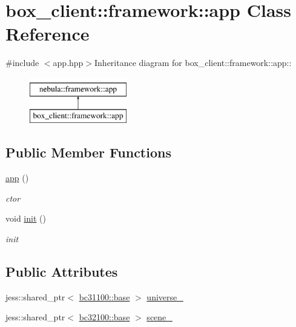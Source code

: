 \hypertarget{classbox__client_1_1framework_1_1app}{
\section{box\_\-client::framework::app Class Reference}
\label{classbox__client_1_1framework_1_1app}
}


{\ttfamily \#include $<$app.hpp$>$}Inheritance diagram for box\_\-client::framework::app::\begin{figure}[H]
\begin{center}
\leavevmode
\includegraphics[height=2cm]{classbox__client_1_1framework_1_1app}
\end{center}
\end{figure}
\subsection*{Public Member Functions}
\begin{DoxyCompactItemize}
\item 
\hyperlink{classbox__client_1_1framework_1_1app_ab7875665a67c5ad9ca66e0250242f994}{app} ()
\begin{DoxyCompactList}\small\item\em ctor \item\end{DoxyCompactList}\item 
void \hyperlink{classbox__client_1_1framework_1_1app_ad7d207b90de357901f98ec1849b6d296}{init} ()
\begin{DoxyCompactList}\small\item\em init \item\end{DoxyCompactList}\end{DoxyCompactItemize}
\subsection*{Public Attributes}
\begin{DoxyCompactItemize}
\item 
jess::shared\_\-ptr$<$ \hyperlink{classbox__client_1_1content_1_1universe_1_1admin_1_1base}{bc31100::base} $>$ \hyperlink{classbox__client_1_1framework_1_1app_ac5df1e5bfccb6417ec23b67e0dbc23c2}{universe\_\-}
\item 
jess::shared\_\-ptr$<$ \hyperlink{classbox__client_1_1content_1_1scene_1_1admin_1_1base}{bc32100::base} $>$ \hyperlink{classbox__client_1_1framework_1_1app_af24e1862739f2bd6aad3cf124e1aa28c}{scene\_\-}
\end{DoxyCompactItemize}


